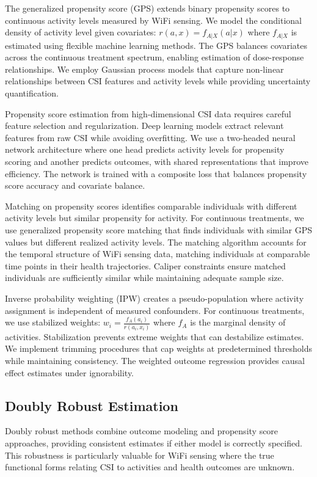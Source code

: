 \documentclass[journal]{IEEEtran}
\begin{document}
The generalized propensity score (GPS) extends binary propensity scores to continuous activity levels measured by WiFi sensing. We model the conditional density of activity level given covariates: $r(a, x) = f_{A|X}(a|x)$ where $f_{A|X}$ is estimated using flexible machine learning methods. The GPS balances covariates across the continuous treatment spectrum, enabling estimation of dose-response relationships. We employ Gaussian process models that capture non-linear relationships between CSI features and activity levels while providing uncertainty quantification.

Propensity score estimation from high-dimensional CSI data requires careful feature selection and regularization. Deep learning models extract relevant features from raw CSI while avoiding overfitting. We use a two-headed neural network architecture where one head predicts activity levels for propensity scoring and another predicts outcomes, with shared representations that improve efficiency. The network is trained with a composite loss that balances propensity score accuracy and covariate balance.

Matching on propensity scores identifies comparable individuals with different activity levels but similar propensity for activity. For continuous treatments, we use generalized propensity score matching that finds individuals with similar GPS values but different realized activity levels. The matching algorithm accounts for the temporal structure of WiFi sensing data, matching individuals at comparable time points in their health trajectories. Caliper constraints ensure matched individuals are sufficiently similar while maintaining adequate sample size.

Inverse probability weighting (IPW) creates a pseudo-population where activity assignment is independent of measured confounders. For continuous treatments, we use stabilized weights: $w_i = \frac{f_A(a_i)}{r(a_i, x_i)}$ where $f_A$ is the marginal density of activities. Stabilization prevents extreme weights that can destabilize estimates. We implement trimming procedures that cap weights at predetermined thresholds while maintaining consistency. The weighted outcome regression provides causal effect estimates under ignorability.

\subsection{Doubly Robust Estimation}

Doubly robust methods combine outcome modeling and propensity score approaches, providing consistent estimates if either model is correctly specified. This robustness is particularly valuable for WiFi sensing where the true functional forms relating CSI to activities and health outcomes are unknown.
\end{document}
